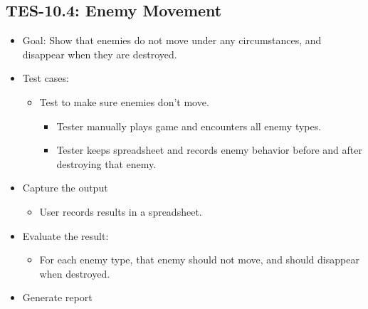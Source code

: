 \subsection{TES-10.4: Enemy Movement }
\begin{itemize}
\item Goal: Show that enemies do not move under any circumstances, and disappear when they are destroyed.
\item Test cases: 

\begin{itemize}
\item Test to make sure enemies don't move.
\begin{itemize}
\item Tester manually plays game and encounters all enemy types.
\item Tester keeps spreadsheet and records enemy behavior before and after destroying that enemy.
\end{itemize}
\end{itemize}
\item Capture the output 
\begin{itemize}
\item User records results in a spreadsheet.
\end{itemize}
\item Evaluate the result: 

\begin{itemize}
\item For each enemy type, that enemy should not move, and should disappear when destroyed.
\end{itemize}
\item Generate report 
\end{itemize}

